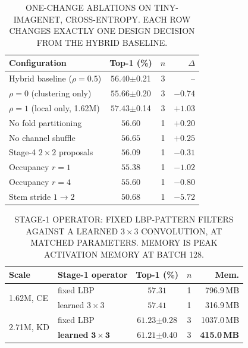 \begin{table}[!t]
\renewcommand{\arraystretch}{1.15}
\caption{\uppercase{One-change ablations on Tiny-ImageNet, cross-entropy.
Each row changes exactly one design decision from the hybrid baseline.}}
\label{tab:ablation}
\centering
\footnotesize
\begin{tabular}{@{}lccr@{}}
\toprule
Configuration & Top-1 (\%) & $n$ & $\Delta$ \\
\midrule
Hybrid baseline ($\rho{=}0.5$) & $56.40${\scriptsize$\pm$0.21} & 3 & -- \\
\midrule
$\rho = 0$ (clustering only) & $55.66${\scriptsize$\pm$0.20} & 3 & $-0.74$ \\
$\rho = 1$ (local only, 1.62M) & $57.43${\scriptsize$\pm$0.14} & 3 & $\mathbf{+1.03}$ \\
\midrule
No fold partitioning & $56.60$ & 1 & $+0.20$ \\
No channel shuffle & $56.65$ & 1 & $+0.25$ \\
Stage-4 $2\times2$ proposals & $56.09$ & 1 & $-0.31$ \\
Occupancy $r = 1$ & $55.38$ & 1 & $-1.02$ \\
Occupancy $r = 4$ & $55.60$ & 1 & $-0.80$ \\
Stem stride $1 \rightarrow 2$ & $50.68$ & 1 & $\mathbf{-5.72}$ \\
\bottomrule
\end{tabular}
\end{table}

\begin{table}[!t]
\renewcommand{\arraystretch}{1.15}
\caption{\uppercase{Stage-1 operator: fixed LBP-pattern filters against a learned
$3\times3$ convolution, at matched parameters. Memory is peak activation
memory at batch 128.}}
\label{tab:operator}
\centering
\footnotesize
\begin{tabular}{@{}llccr@{}}
\toprule
Scale & Stage-1 operator & Top-1 (\%) & $n$ & Mem. \\
\midrule
\multirow{2}{*}{1.62M, CE} & fixed LBP & $57.31$ & 1 & 796.9\,MB \\
 & learned $3\times3$ & $57.41$ & 1 & 316.9\,MB \\
\midrule
\multirow{2}{*}{2.71M, KD} & fixed LBP & $61.23${\scriptsize$\pm$0.28} & 3 & 1037.0\,MB \\
 & \textbf{learned} $\mathbf{3\times3}$ & $61.21${\scriptsize$\pm$0.40} & 3 & \textbf{415.0\,MB} \\
\bottomrule
\end{tabular}
\end{table}

